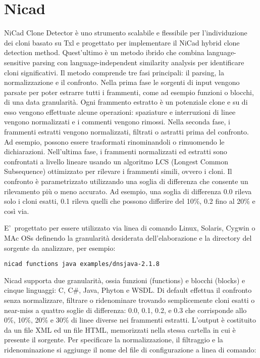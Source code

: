 \section{Nicad}
NiCad Clone Detector è uno strumento scalabile e flessibile per l'individuzione dei cloni basato su Txl e progettato per implementare il NiCad hybrid clone detection method. Quest'ultimo è un metodo ibrido che combina language-sensitive parsing con language-independent similarity analysis per identificare cloni significativi.
Il metodo comprende tre fasi principali: il parsing, la normalizzazione e il confronto.
Nella prima fase le sorgenti di input vengono parsate per poter estrarre tutti i frammenti, come ad esempio funzioni o blocchi, di una data granularità. Ogni frammento estratto è un potenziale clone e su di esso vengono effettuate alcune operazioni: spaziature e interruzioni di linee vengono normalizzati e i commenti vengono rimossi. 
Nella seconda fase, i frammenti estratti vengono normalizzati, filtrati o astratti prima del confronto. Ad esempio, possono essere trasformati rinominandoli o rimuomendo le dichiarazioni.
Nell'ultima fase, i frammenti normalizzati ed estratti sono confrontati a livello lineare usando un algoritmo LCS (Longest Common Subsequence) ottimizzato per rilevare i frammenti simili, ovvero i cloni. Il confronto è parametrizzato utilizzando una soglia di differenza che consente un rilevamento più o meno accurato. Ad esempio, una soglia di differenza 0.0 rileva solo i cloni esatti, 0.1 rileva quelli che possono differire del 10\%, 0.2 fino al 20\% e così via.

E'\ progettato per essere utilizzato via linea di comando Linux, Solaris, Cygwin o MAc OSs definendo la granularità desiderata dell'elaborazione e la directory del sorgente da analizzare, per esempio: 

\begin{center}
\verb|nicad functions java examples/dnsjava-2.1.8|
\end{center}

Nicad supporta due granularità, ossia funzioni (functions) e blocchi (blocks) e cinque linguaggi: C, C\#, Java, Phyton e WSDL.
Di default effettua il confronto senza normalizzare, filtrare o ridenominare trovando semplicemente cloni esatti o near-miss a quattro soglie di differenza: 0.0, 0.1, 0.2, e 0.3 che corrisponde allo 0\%, 10\%, 20\% e 30\% di linee diverse nei frammenti estratti.
L'output è costituito da un file XML ed un file HTML, memorizzati nella stessa cartella in cui è presente il sorgente. 
Per specificare la normalizzazione, il filtraggio e la ridenominazione si aggiunge il nome del file di configurazione a linea di comando:

